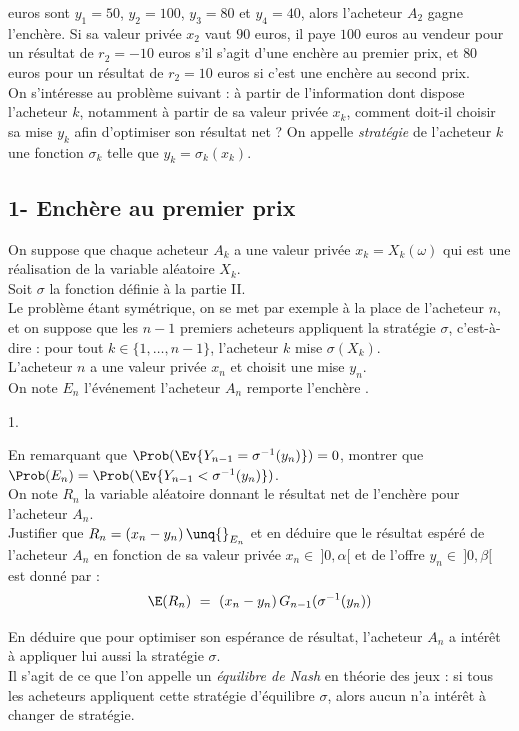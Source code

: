 euros sont $y_1=50$, $y_2=100$, $y_3=80$ et $y_4=40$, alors l'acheteur 
$A_2$ gagne l'enchère. Si sa valeur privée $x_2$ vaut $90$ euros, il 
paye $100$ euros au vendeur pour un résultat de $r_2=-10$ euros s'il 
s'agit d'une enchère au premier prix, et $80$ euros pour un résultat de 
$r_2=10$ euros si c'est une enchère au second prix.\\
On s'intéresse au problème suivant : à partir de l'information dont 
dispose l'acheteur $k$, notamment à partir de sa valeur privée $x_k$, 
comment doit-il choisir sa mise $y_k$ afin d'optimiser son résultat net 
? On appelle \emph{stratégie} de l'acheteur $k$ une fonction $\sigma_k$ 
telle que $y_k = \sigma_k(x_k)$.



\subsection*{1- Enchère au premier prix}

\noindent
On suppose que chaque acheteur $A_k$ a une valeur privée $x_k = 
X_k(\omega)$ qui est une réalisation de la variable aléatoire $X_k$.\\
Soit $\sigma$ la fonction définie à la partie II.\\
Le problème étant symétrique, on se met par exemple à la place de 
l'acheteur $n$, et on suppose que les $n-1$ premiers acheteurs 
appliquent la stratégie $\sigma$, c'est-à-dire : pour tout $k\in \{1, 
\ldots, n-1\}$, l'acheteur $k$ mise $\sigma(X_k)$.\\
L'acheteur $n$ a une valeur privée $x_n$ et choisit une mise $y_n$.\\
On note $E_n$ l'événement \og l'acheteur $A_n$ remporte l'enchère \fg{}.
\begin{noliste}{1.}
  \setlength{\itemsep}{4mm}
  \setcounter{enumi}{9}
  \item En remarquant que $\Prob(\Ev{Y_{n-1} = \sigma^{-1}(y_n)}) = 0$,
  montrer que $\Prob(E_n) = \Prob(\Ev{Y_{n-1} < \sigma^{-1}(y_n)})$.\\
  On note $R_n$ la variable aléatoire donnant le résultat net de 
  l'enchère pour l'acheteur $A_n$.\\
  Justifier que $R_n = (x_n-y_n) \, \unq{}_{E_n}$ et en déduire que le 
  résultat espéré de l'acheteur $A_n$ en fonction de sa valeur 
  privée $x_n \in \ ]0,\alpha[$ et de l'offre $y_n \in \ ]0,\beta[$ 
  est donné par :
  \[
    \E(R_n) \ = \ (x_n-y_n) \, G_{n-1}(\sigma^{-1}(y_n))
  \]
  
  
  
  
  
  
  \item En déduire que pour optimiser son espérance de résultat, 
  l'acheteur $A_n$ a intérêt à appliquer lui aussi la stratégie 
  $\sigma$.\\
  Il s'agit de ce que l'on appelle un \emph{équilibre de Nash} en 
  théorie des jeux : si tous les acheteurs appliquent cette 
  stratégie d'équilibre $\sigma$, alors aucun n'a intérêt à 
  changer de stratégie.
  
  
\end{noliste}



